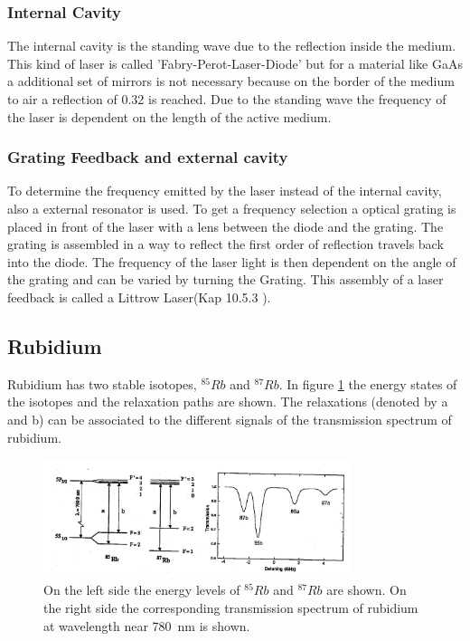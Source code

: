 \subsubsection{Internal Cavity}
The internal cavity is the standing wave due to the reflection inside the medium.
This kind of laser is called 'Fabry-Perot-Laser-Diode' but for a material like GaAs a additional set of mirrors is not necessary because on the border of the medium to air a reflection of \num{0.32} is reached.
Due to the standing wave the frequency of the laser is dependent on the length of the active medium. 
\subsubsection{Grating Feedback and external cavity}
\label{sec:grating}
To determine the frequency emitted by the laser instead of the internal cavity, also a external resonator is used.
To get a frequency selection a optical grating is placed in front of the laser with a lens between the diode and the grating.
The grating is assembled in a way to reflect the first order of reflection travels back into the diode.
The frequency of the laser light is then dependent on the angle of the grating and can be varied by turning the Grating.
This assembly of a laser feedback is called a Littrow Laser(Kap 10.5.3 \cite{eichler_laser}).
\subsection{Rubidium}
Rubidium has two stable isotopes, $^{85}Rb$ and $^{87}Rb$.
In figure \ref{fig:rubidium} the energy states of the isotopes and the relaxation paths are shown.
The relaxations (denoted by a and b) can be associated to the different signals of the transmission spectrum of rubidium.
\cite{rubidium}
\begin{figure}
    \center
    \includegraphics[width=0.8\textwidth]{bilder/Rubidium_Energy.png}
    \caption{On the left side the energy levels of $^{85}Rb$ and $^{87}Rb$ are shown. On the right side the corresponding transmission spectrum of rubidium at wavelength near \SI{780}{\nano \metre} is shown. \cite{anleitung}}
    \label{fig:rubidium}
\end{figure}